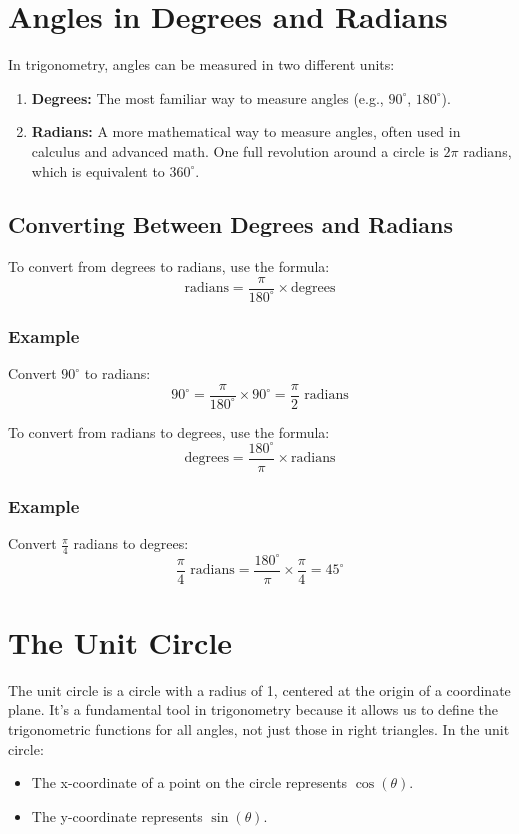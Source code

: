 \section{Angles in Degrees and Radians}
In trigonometry, angles can be measured in two different units:
\begin{enumerate}
    \item \textbf{Degrees:} The most familiar way to measure angles (e.g., $90^\circ$, $180^\circ$).
    \item \textbf{Radians:} A more mathematical way to measure angles, often used in calculus and advanced math. One full revolution around a circle is $2\pi$ radians, which is equivalent to $360^\circ$.
\end{enumerate}

\subsection{Converting Between Degrees and Radians}
To convert from degrees to radians, use the formula:
\[
\text{radians} = \frac{\pi}{180^\circ} \times \text{degrees}
\]

\subsubsection{Example}
Convert $90^\circ$ to radians:
\[
90^\circ = \frac{\pi}{180^\circ} \times 90^\circ = \frac{\pi}{2} \text{ radians}
\]

To convert from radians to degrees, use the formula:
\[
\text{degrees} = \frac{180^\circ}{\pi} \times \text{radians}
\]

\subsubsection{Example}
Convert $\frac{\pi}{4}$ radians to degrees:
\[
\frac{\pi}{4} \text{ radians} = \frac{180^\circ}{\pi} \times \frac{\pi}{4} = 45^\circ
\]

\section{The Unit Circle}
The unit circle is a circle with a radius of 1, centered at the origin of a coordinate plane. It’s a fundamental tool in trigonometry because it allows us to define the trigonometric functions for all angles, not just those in right triangles.
In the unit circle:
\begin{itemize}
    \item The x-coordinate of a point on the circle represents $\cos(\theta)$.
    \item The y-coordinate represents $\sin(\theta)$.
\end{itemize}

